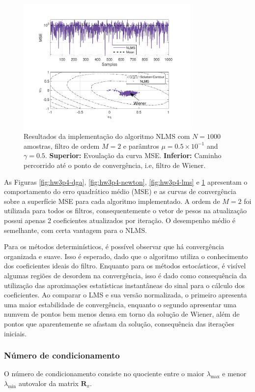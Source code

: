 \begin{figure}[!htp]
    \centering
    \includegraphics[width=0.80\textwidth]{fig/hw3p4-nlms.pdf}
    \caption{Resultados da implementação do algoritmo NLMS com $N = 1000$ amostras, filtro de ordem $M = 2$ e parâmtros $\mu = 0.5 \times 10^{-1}$ and $\gamma = 0.5 $. \textbf{Superior:} Evoulação da curva MSE. \textbf{Inferior:} Caminho percorrido até o ponto de convergência, i.e, filtro de Wiener.}
    \label{fig:hw3p4-nlms}
\end{figure}


As Figuras \ref{fig:hw3p4-dga}, \ref{fig:hw3p4-newton}, \ref{fig:hw3p4-lms} e \ref{fig:hw3p4-nlms} apresentam o comportamento do erro quadrático médio (MSE) e as curvas de convergência sobre a superfície MSE para cada algoritmo implementado. A ordem de $M = 2$ foi utilizada para todos os filtros, consequentemente o vetor de pesos na atualização possui apenas 2 coeficientes atualizados por iteração. O desempenho médio é semelhante, com certa vantagem para o NLMS.

Para os métodos determinísticos, é possível observar que há convergência organizada e suave. Isso é esperado, dado que o algoritmo utiliza o conhecimento dos coeficientes ideais do filtro. Enquanto para os métodos estocásticos, é visível algumas regiões de desordem na convergência, isso é dado como consequência da utilização das aproximações estatísticas instantâneas do sinal para o cálculo dos coeficientes. Ao comparar o LMS e sua versão normalizada, o primeiro apresenta uma maior estabilidade de convergência, enquanto o segundo apresentar uma numvem de pontos bem menos densa em torno da solução de Wiener, além de pontos que aparentemente se afastam da solução, consequência das iterações iniciais.

\subsubsection*{Número de condicionamento}
O número de condicionamento consiste no quociente entre o maior $\lambda_{\max}$ e menor $\lambda_{\min}$ autovalor da matrix $\mathbf{R}_{x}$.

